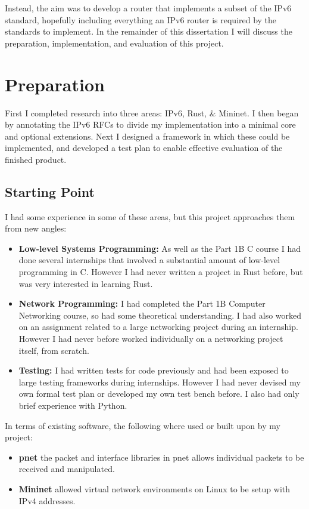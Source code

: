 \documentclass[12pt,a4paper,twoside,openany]{report}
\begin{document}
Instead, the aim was to develop a router that implements a subset of the IPv6 standard, hopefully including everything an IPv6 router is required by the standards to implement.  In the remainder of this dissertation I will discuss the preparation, implementation, and evaluation of this project.

\chapter{Preparation}
\label{chap::preparation}

First I completed research into three areas: IPv6, Rust, \& Mininet. I then began by annotating the IPv6 RFCs\cite{ipv6_rfc}\cite{ipv6_rfc_adr}\cite{icmpv6_rfc} to divide my implementation into a minimal core and optional extensions. Next I designed a framework in which these could be implemented, and developed a test plan to enable effective evaluation of the finished product.

\section{Starting Point}
I had some experience in some of these areas, but this project approaches them from new angles:
\begin{itemize}
\item \textbf{Low-level Systems Programming:} As well as the Part 1B C course I had done several internships that involved a substantial amount of low-level programming in C. However I had never written a project in Rust before, but was very interested in learning Rust.
\item \textbf{Network Programming:} I had completed the Part 1B Computer Networking course, so had some theoretical understanding.  I had also worked on an assignment related to a large networking project during an internship.  However I had never before worked individually on a networking project itself, from scratch.
\item \textbf{Testing:} I had written tests for code previously and had been exposed to large testing frameworks during internships.  However I had never devised my own formal test plan or developed my own test bench before. I also had only brief experience with Python.
\end{itemize}
In terms of existing software, the following where used or built upon by my project:
\begin{itemize}
\item \textbf{pnet}\cite{pnet_rust} the packet and interface libraries in pnet allows individual packets to be received and manipulated.
\item \textbf{Mininet}\cite{mininet} allowed virtual network environments on Linux to be setup with IPv4 addresses.
\end{itemize}
\end{document}
